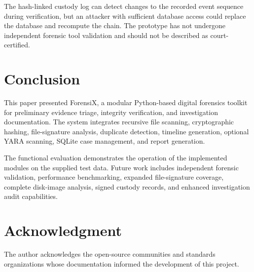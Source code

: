 \documentclass[conference]{IEEEtran}
\begin{document}
The hash-linked custody log can detect changes to the recorded event sequence during verification, but an attacker with sufficient database access could replace the database and recompute the chain. The prototype has not undergone independent forensic tool validation and should not be described as court-certified.

\section{Conclusion}
This paper presented ForensiX, a modular Python-based digital forensics toolkit for preliminary evidence triage, integrity verification, and investigation documentation. The system integrates recursive file scanning, cryptographic hashing, file-signature analysis, duplicate detection, timeline generation, optional YARA scanning, SQLite case management, and report generation.

The functional evaluation demonstrates the operation of the implemented modules on the supplied test data. Future work includes independent forensic validation, performance benchmarking, expanded file-signature coverage, complete disk-image analysis, signed custody records, and enhanced investigation audit capabilities.

\section*{Acknowledgment}
The author acknowledges the open-source communities and standards organizations whose documentation informed the development of this project.
\end{document}
